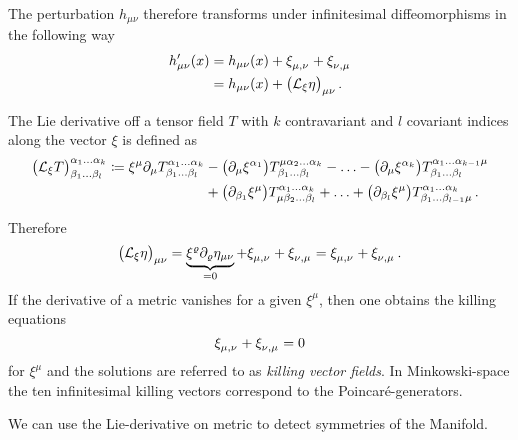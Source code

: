 The perturbation $h_{\mu\nu}$ therefore transforms  under infinitesimal
diffeomorphisms in the following way
\begin{equation}
    \begin{split}
        h'_{\mu\nu}(x) &= h_{\mu\nu}(x) + \tensor{\xi}{_\mu_,_\nu} + \tensor{\xi}{_\nu_,_\mu} \\
        &= h_{\mu\nu}(x) + \left(\liedif{\xi}{\eta} \right)_{\mu\nu}\,.
    \end{split}
\end{equation}
\begin{definition}
    The Lie derivative off a tensor field $T$ with $k$ contravariant and $l$
    covariant indices along the vector $\xi$ is defined as
    \begin{equation}
        \begin{split}
            \left( \liedif{\xi}{T} \right)^{\alpha_1\ldots\alpha_k}_{\beta_1\ldots\beta_l}
            \coloneqq \xi^\mu \partial_\mu T^{\alpha_1\ldots\alpha_k}_{\beta_1\ldots\beta_l}
            & - \left( \partial_\mu \xi^{\alpha_1} \right) T^{\mu\alpha_2\ldots\alpha_k}_{\beta_1\ldots\beta_l} - \ldots
            - \left( \partial_\mu \xi^{\alpha_k} \right) T^{\alpha_1\ldots\alpha_{k-1}\mu}_{\beta_1\ldots\beta_l} \\
            & + \left( \partial_{\beta_1} \xi^\mu \right) T^{\alpha_1\ldots\alpha_k}_{\mu\beta_2\ldots\beta_l} + \ldots
            +  \left( \partial_{\beta_l} \xi^\mu \right)
            T^{\alpha_1\ldots\alpha_k}_{\beta_1\ldots\beta_{l-1}\mu}\,.
        \end{split}
    \end{equation}
\end{definition}
Therefore
\begin{equation}
    \left( \liedif{\xi}{\eta} \right)_{\mu\nu} = \underbrace{\xi^\varrho\partial_\varrho\eta_{\mu\nu}}_{=0}
    + \tensor{\xi}{_\mu_,_\nu} + \tensor{\xi}{_\nu_,_\mu} =
    \tensor{\xi}{_\mu_,_\nu} + \tensor{\xi}{_\nu_,_\mu}\,.
\end{equation}
If the derivative of a metric vanishes for a given $\xi^\mu$, then one obtains
the killing equations 
\begin{equation}
    \tensor{\xi}{_\mu_,_\nu} + \tensor{\xi}{_\nu_,_\mu}=0  %
\end{equation}
for $\xi^\mu$ and the solutions are referred to as \emph{killing vector fields}.
In Minkowski-space the ten infinitesimal killing vectors correspond to the Poincaré-generators.
\begin{sidenote}
We can use the Lie-derivative on metric to detect symmetries of the Manifold.
\end{sidenote}

